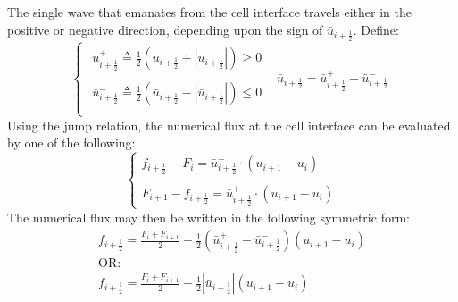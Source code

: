 \documentclass[11pt, a4paper]{article}
\begin{document}
The single wave that emanates from the cell interface travels either in the positive or negative direction, depending upon the sign of $\bar{u}_{i+\frac{1}{2}}$. Define:
\begin{equation}
    \left\{\begin{array}{cc}
        \begin{array}{c}
            \bar{u}_{i+\frac{1}{2}}^+\triangleq\displaystyle\frac{1}{2}\left(\bar{u}_{i+\frac{1}{2}}+\left|\bar{u}_{i+\frac{1}{2}}\right|\right)\geq0 \\\\
            \bar{u}_{i+\frac{1}{2}}^-\triangleq\displaystyle\frac{1}{2}\left(\bar{u}_{i+\frac{1}{2}}-\left|\bar{u}_{i+\frac{1}{2}}\right|\right)\leq0 \\
        \end{array} & \bar{u}_{i+\frac{1}{2}}=\bar{u}_{i+\frac{1}{2}}^++\bar{u}_{i+\frac{1}{2}}^-
    \end{array}\right.
\end{equation}
Using the jump relation, the numerical flux at the cell interface can be evaluated by one of the following:
\begin{equation}
    \left\{\begin{array}{l}
        f_{i+\frac{1}{2}}-F_i = \bar{u}_{i+\frac{1}{2}}^-\cdot\left(u_{i+1}-u_i\right) \\\\
        F_{i+1}-f_{i+\frac{1}{2}}=\bar{u}_{i+\frac{1}{2}}^+\cdot\left(u_{i+1}-u_i\right)
    \end{array}\right.
\end{equation}
The numerical flux may then be written in the following symmetric form:
\begin{equation}
    \begin{array}{l}
        \displaystyle f_{i+\frac{1}{2}}=\frac{F_i+F_{i+1}}{2}-\frac{1}{2}\left(\bar{u}_{i+\frac{1}{2}}^+-\bar{u}_{i+\frac{1}{2}}^-\right)\left(u_{i+1}-u_i\right) \\
        \mathrm{OR:} \\
        \displaystyle f_{i+\frac{1}{2}}=\frac{F_i+F_{i+1}}{2}-\frac{1}{2}\left|\bar{u}_{i+\frac{1}{2}}\right|\left(u_{i+1}-u_i\right)
    \end{array}
\end{equation}
\end{document}
